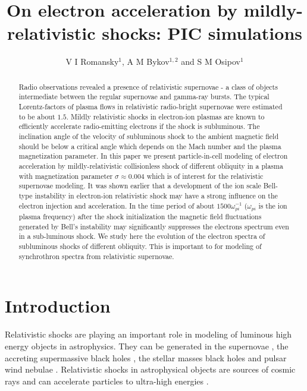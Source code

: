 \documentclass[a4paper]{jpconf}
\begin{document}
	\title{On electron acceleration  by mildly-relativistic shocks: PIC simulations}
	
	\author{V I Romansky$^{1}$, A M Bykov$^{1,2}$ and S M Osipov$^{1}$}
	
	\address{$^1$ Ioffe Institute, 26 Politekhnicheskaya st., St. Petersburg 194021, Russia}
	\address{$^2$ Peter the Great St. Petersburg Polytechnic University, 29 Politekhnicheskaya st., St. Petersburg 195251, Russia}
	
	
	\begin{abstract}
                 Radio observations revealed a presence of relativistic supernovae - a class of objects intermediate between the regular supernovae and gamma-ray bursts. The typical Lorentz-factors of plasma flows in relativistic radio-bright supernovae were estimated to be about $1.5$. Mildly relativistic shocks in electron-ion plasmas are known to efficiently accelerate radio-emitting electrons if the shock is subluminous. The inclination angle of the velocity of subluminous shock to the ambient magnetic field should be below a critical angle which depends on the Mach number and the plasma magnetization parameter.  In this paper we present particle-in-cell modeling of electron acceleration by mildly-relativistic collisionless shock of different obliquity in a plasma with magnetization parameter $\sigma \approx 0.004$ which is of interest for the relativistic supernovae modeling. It was shown earlier that  a development of the ion scale Bell-type instability in electron-ion relativistic shock may have a strong influence on the electron injection and acceleration. In the time period of about $1500 \omega_{pi}^{-1}$  ($\omega_{pi}$ is the ion plasma frequency) after the shock initialization the  magnetic field fluctuations  generated by Bell's instability may significantly suppresses the electrons spectrum even in a sub-luminous shock. We study here the evolution of the electron spectra of subluminous shocks of different obliquity. This is important to for modeling of synchrothron spectra from relativistic supernovae.
	\end{abstract}
	
	\section{Introduction}
	Relativistic shocks are playing an important role  in modeling of luminous high energy objects in  astrophysics. They can be generated in the supernovae \cite{2010Natur.463..513S,2007ApJ...667..351W}, the accreting supermassive black holes \cite{1984RvMP...56..255B}, the stellar masses black holes \cite{2019MmSAI..90...57M,1999PhR...314..575P,2014LNP...876.....R} and pulsar wind nebulae \cite{Amato2006,2017SSRv..207..235B,2017JPlPh..83e6301K,2019ApJ...876L...8B}. Relativistic shocks in astrophysical objects are sources of cosmic rays \cite{2012SSRv..173..309B,2015SSRv..191..519S,Pelletier2017} and can accelerate particles to ultra-high energies \cite{Wang2007,2009JCAP...11..009L,BEMO18}. 
	
\end{document}
